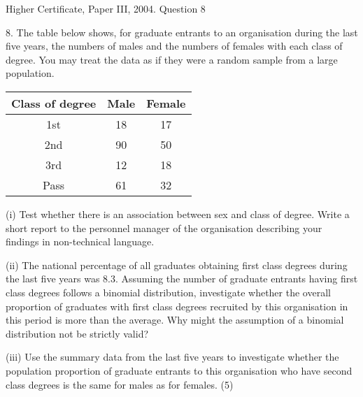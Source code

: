 \documentclass[a4paper,12pt]{article}
\begin{document}
Higher Certificate, Paper III, 2004.  Question 8 
\begin{framed}
8.
The table below shows, for graduate entrants to an organisation during the last five
years, the numbers of males and the numbers of females with each class of degree.
You may treat the data as if they were a random sample from a large population.

\begin{center}
\begin{tabular}{|c|c|c|}
Class of degree	&	Male	&	Female	\\ \hline
1st	&	18	&	17	\\ \hline
2nd	&	90	&	50	\\ \hline
3rd	&	12	&	18	\\ \hline
Pass	&	61	&	32	\\ \hline
\end{tabular}
\end{center}
(i) Test whether there is an association between sex and class of degree. Write a
short report to the personnel manager of the organisation describing your
findings in non-technical language.
\end{framed}
\begin{framed}
(ii) The national percentage of all graduates obtaining first class degrees during the
last five years was 8.3. Assuming the number of graduate entrants having first
class degrees follows a binomial distribution, investigate whether the overall
proportion of graduates with first class degrees recruited by this organisation in
this period is more than the average. Why might the assumption of a binomial
distribution not be strictly valid?
\end{framed}
\begin{framed}
(iii) Use the summary data from the last five years to investigate whether the
population proportion of graduate entrants to this organisation who have
second class degrees is the same for males as for females.
(5)
\end{framed}
\end{document}
